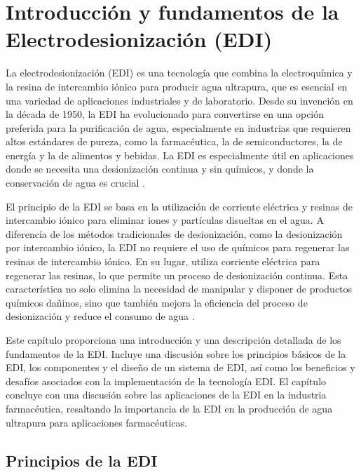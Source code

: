 \chapter{Introducción y fundamentos de la Electrodesionización (EDI)}\label{cap:fundamentosEDI}
\vspace{-2cm} 
La electrodesionización (EDI) es una tecnología que combina la electroquímica y la resina de intercambio iónico
para producir agua ultrapura, que es esencial en una variedad de aplicaciones industriales y de laboratorio.
Desde su invención en la década de 1950, la EDI ha evolucionado para convertirse en una opción preferida para
la purificación de agua, especialmente en industrias que requieren altos estándares de pureza, como la farmacéutica,
la de semiconductores, la de energía y la de alimentos y bebidas. La EDI es especialmente útil en aplicaciones donde se
necesita una desionización continua y sin químicos, y donde la conservación de agua es crucial \cite{alvaradoElectrodeionizationPrinciplesStrategies2014}.

El principio de la EDI se basa en la utilización de corriente eléctrica y resinas de intercambio iónico
para eliminar iones y partículas disueltas en el agua. A diferencia de los métodos tradicionales de desionización,
como la desionización por intercambio iónico, la EDI no requiere el uso de químicos para regenerar las resinas de
intercambio iónico. En su lugar, utiliza corriente eléctrica para regenerar las resinas, lo que permite un proceso
de desionización continua. Esta característica no solo elimina la necesidad de manipular y disponer de productos
químicos dañinos, sino que también mejora la eficiencia del proceso de desionización y reduce el consumo de agua \cite{condorchemUltrapureWaterElectrodeionization2019}.

Este capítulo proporciona una introducción y una descripción detallada de los fundamentos de la EDI. Incluye una
discusión sobre los principios básicos de la EDI, los componentes y el diseño de un sistema de EDI, así como los
beneficios y desafíos asociados con la implementación de la tecnología EDI. El capítulo concluye con una discusión
sobre las aplicaciones de la EDI en la industria farmacéutica, resaltando la importancia de la EDI en la producción
de agua ultrapura para aplicaciones farmacéuticas.

\section{Principios de la EDI}

